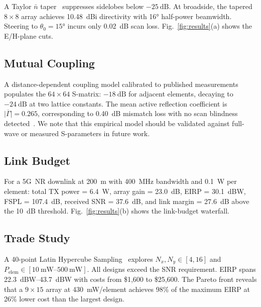 \documentclass[journal]{IEEEtran}
\begin{document}
A Taylor $\bar{n}$ taper~\cite{taylor1955} suppresses sidelobes below
$-\SI{25}{\deci\bel}$. At broadside, the tapered $8\times8$ array
achieves \SI{10.48}{dBi} directivity with \ang{16} half-power beamwidth.
Steering to $\theta_0 = \ang{15}$ incurs only \SI{0.02}{\deci\bel} scan
loss. Fig.~\ref{fig:results}(a) shows the E/H-plane cuts.

\subsection{Mutual Coupling}

A distance-dependent coupling model calibrated to published
measurements~\cite{pozar1994} populates the $64\times64$ S-matrix:
$-\SI{18}{\deci\bel}$ for adjacent elements, decaying to
$-\SI{24}{\deci\bel}$ at two lattice constants. The mean active
reflection coefficient is $\overline{|\Gamma|} = 0.265$, corresponding
to \SI{0.40}{\deci\bel} mismatch loss with no scan blindness
detected~\cite{pozar1984}. We note that this empirical model should be
validated against full-wave or measured S-parameters in future work.

\subsection{Link Budget}

For a 5G~NR downlink at \SI{200}{\meter} with \SI{400}{\mega\hertz}
bandwidth and \SI{0.1}{\watt} per element: total TX power =
\SI{6.4}{\watt}, array gain = \SI{23.0}{\deci\bel}, EIRP =
\SI{30.1}{dBW}, FSPL = \SI{107.4}{\deci\bel}, received SNR =
\SI{37.6}{\deci\bel}, and link margin = \SI{27.6}{\deci\bel} above the
\SI{10}{\deci\bel} threshold. Fig.~\ref{fig:results}(b) shows the
link-budget waterfall.

\subsection{Trade Study}

A 40-point Latin Hypercube Sampling~\cite{mckay1979} explores $N_x,
N_y \in [4, 16]$ and $P_\mathrm{elem} \in
[\SIrange{10}{500}{\milli\watt}]$. All designs exceed the SNR
requirement. EIRP spans \SIrange{22.3}{43.7}{dBW} with costs from
\$1,600 to \$25,600. The Pareto front reveals that a $9\times15$ array
at \SI{430}{\milli\watt}/element achieves 98\% of the maximum EIRP at
26\% lower cost than the largest design.

\end{document}
